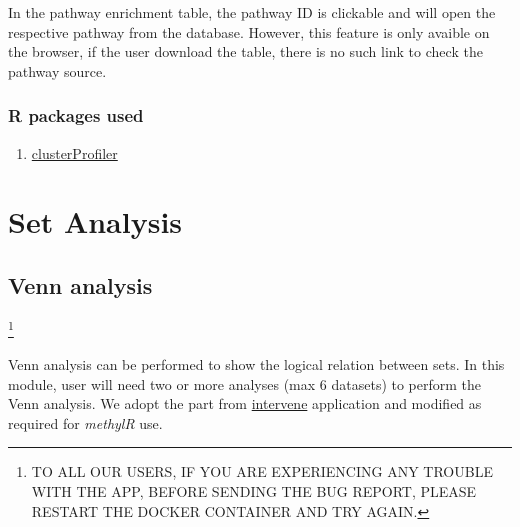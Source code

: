 \documentclass[
  a4paper,
  oneside,
  open=any]{scrreport}
\providecommand{\tightlist}{%
  \setlength{\itemsep}{0pt}\setlength{\parskip}{0pt}}\usepackage{longtable,booktabs,array}
\begin{document}
\begin{tcolorbox}[enhanced jigsaw, title=\textcolor{quarto-callout-warning-color}{\faExclamationTriangle}\hspace{0.5em}{Warning}, rightrule=.15mm, coltitle=black, colback=white, opacitybacktitle=0.6, colframe=quarto-callout-warning-color-frame, colbacktitle=quarto-callout-warning-color!10!white, opacityback=0, leftrule=.75mm, bottomtitle=1mm, toptitle=1mm, breakable, left=2mm, titlerule=0mm, arc=.35mm, toprule=.15mm, bottomrule=.15mm]

In the pathway enrichment table, the pathway ID is clickable and will
open the respective pathway from the database. However, this feature is
only avaible on the browser, if the user download the table, there is no
such link to check the pathway source.

\end{tcolorbox}

\hypertarget{r-packages-used-3}{%
\section{R packages used}\label{r-packages-used-3}}

\begin{enumerate}
\def\labelenumi{\arabic{enumi}.}
\tightlist
\item
  \href{https://bioconductor.org/packages/release/bioc/vignettes/clusterProfiler/inst/doc/clusterProfiler.html}{clusterProfiler}
\end{enumerate}

\part{Set Analysis}

\hypertarget{sec-venn}{%
\chapter{Venn analysis}\label{sec-venn}}

\footnote{TO ALL OUR USERS, IF YOU ARE EXPERIENCING ANY TROUBLE WITH THE
  APP, BEFORE SENDING THE BUG REPORT, PLEASE RESTART THE DOCKER
  CONTAINER AND TRY AGAIN.}

Venn analysis can be performed to show the logical relation between
sets. In this module, user will need two or more analyses (max 6
datasets) to perform the Venn analysis. We adopt the part from
\href{https://github.com/asntech/intervene}{intervene}
\autocite{khan2017intervene} application and modified as required for
\emph{methylR} use.
\end{document}
